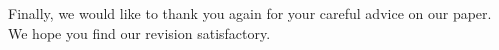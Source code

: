 \documentclass[12pt,letterpaper,english]{article}
\begin{document}
	
	\bigskip
	
	\noindent Finally, we would like to thank you again for your careful advice on our paper. We hope you find our revision satisfactory.
	
	
	
\end{document}
